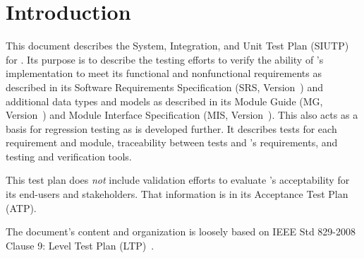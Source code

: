\section{Introduction}
This document describes the System, Integration, and Unit Test Plan (SIUTP) for
\progname{}. Its purpose is to describe the testing efforts to verify the
ability of \progname{}'s implementation to meet its functional and
nonfunctional requirements as described in its Software Requirements
Specification (SRS, Version~\srsVersion) and additional data types and models
as described in its Module Guide (MG, Version~\mgversion) and Module Interface
Specification (MIS, Version~\misversion). This also acts as a basis for
regression testing as \progname{} is developed further. It describes tests for
each requirement and module, traceability between tests and \progname{}'s
requirements, and testing and verification tools.

This test plan does \textit{not} include validation efforts to evaluate
\progname{}'s acceptability for its end-users and stakeholders. That
information is in its Acceptance Test Plan (ATP).

The document's content and organization is loosely based on IEEE Std 829-2008
Clause 9: Level Test Plan (LTP)~\citep{vvDocIEEE}.










